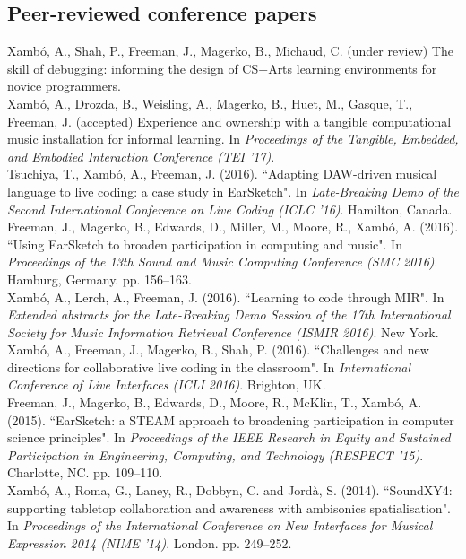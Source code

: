 \documentclass[10pt, a4paper]{article}
\newcommand{\years}[1]{\marginnote{\scriptsize #1}}
\begin{document}
\subsection*{Peer-reviewed conference papers}
\noindent
\years{2016f}Xambó, A., Shah, P., Freeman, J., Magerko, B., Michaud, C. (under review) The skill of debugging: informing the design of CS+Arts learning environments for novice programmers.\\ 
\years{2016e}Xambó, A., Drozda, B., Weisling, A., Magerko, B., Huet, M., Gasque, T., Freeman, J. (accepted) Experience and ownership with a tangible computational music installation for informal learning. In \emph{Proceedings of the Tangible, Embedded, and Embodied Interaction Conference (TEI '17)}. \\ 
\years{2016d}Tsuchiya, T., Xambó, A., Freeman, J. (2016). “Adapting DAW-driven musical language to live coding: a case study in EarSketch". In \emph{Late-Breaking Demo of the Second International Conference on Live Coding (ICLC '16)}. Hamilton, Canada.\\ 
\years{2016c}Freeman, J., Magerko, B., Edwards, D., Miller, M., Moore, R., Xambó, A. (2016). “Using EarSketch to broaden participation in computing and music". In \emph{Proceedings of the 13th Sound and Music Computing Conference (SMC 2016)}. Hamburg, Germany. pp. 156--163.\\
\years{2016b}Xambó, A., Lerch, A., Freeman, J. (2016). “Learning to code through MIR". In \emph{Extended abstracts for the Late-Breaking Demo Session of the 17th International Society for Music Information Retrieval Conference (ISMIR 2016)}. New York.\\
\years{2016a}Xambó, A., Freeman, J., Magerko, B., Shah, P. (2016). “Challenges and new directions for collaborative live coding in the classroom". In \emph{International Conference of Live Interfaces (ICLI 2016)}. Brighton, UK.\\
\years{2015}Freeman, J., Magerko, B., Edwards, D., Moore, R., McKlin, T., Xambó, A. (2015). “EarSketch: a STEAM approach to broadening participation in computer science principles". In \emph{Proceedings of the IEEE Research in Equity and Sustained Participation in Engineering, Computing, and Technology (RESPECT '15)}. Charlotte, NC. pp. 109--110.\\
\years{2014b}Xambó, A., Roma, G., Laney, R., Dobbyn, C. and Jordà, S. (2014). “SoundXY4: supporting tabletop collaboration and awareness with ambisonics spatialisation". In \emph{Proceedings of the International Conference on New Interfaces for Musical Expression 2014 (NIME '14)}. London. pp. 249--252.\\
\end{document}
